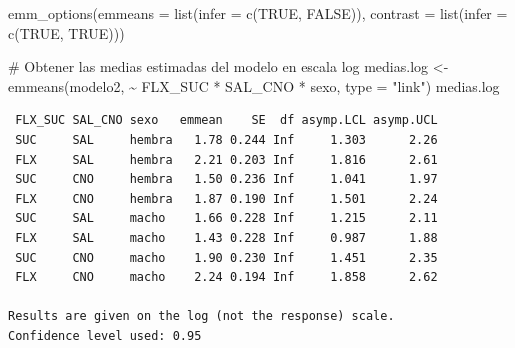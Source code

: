 \documentclass[
  letterpaper,
  DIV=11,
  numbers=noendperiod]{scrartcl}
\newenvironment{Shaded}{\begin{snugshade}}{\end{snugshade}}
\newcommand{\AttributeTok}[1]{\textcolor[rgb]{0.40,0.45,0.13}{#1}}
\newcommand{\CommentTok}[1]{\textcolor[rgb]{0.37,0.37,0.37}{#1}}
\newcommand{\ConstantTok}[1]{\textcolor[rgb]{0.56,0.35,0.01}{#1}}
\newcommand{\FunctionTok}[1]{\textcolor[rgb]{0.28,0.35,0.67}{#1}}
\newcommand{\NormalTok}[1]{\textcolor[rgb]{0.00,0.23,0.31}{#1}}
\newcommand{\OtherTok}[1]{\textcolor[rgb]{0.00,0.23,0.31}{#1}}
\newcommand{\SpecialCharTok}[1]{\textcolor[rgb]{0.37,0.37,0.37}{#1}}
\newcommand{\StringTok}[1]{\textcolor[rgb]{0.13,0.47,0.30}{#1}}
\begin{document}
\begin{Shaded}
\begin{Highlighting}[]
\FunctionTok{emm\_options}\NormalTok{(}\AttributeTok{emmeans =} \FunctionTok{list}\NormalTok{(}\AttributeTok{infer =} \FunctionTok{c}\NormalTok{(}\ConstantTok{TRUE}\NormalTok{, }\ConstantTok{FALSE}\NormalTok{)),}
            \AttributeTok{contrast =} \FunctionTok{list}\NormalTok{(}\AttributeTok{infer =} \FunctionTok{c}\NormalTok{(}\ConstantTok{TRUE}\NormalTok{, }\ConstantTok{TRUE}\NormalTok{)))}

\CommentTok{\# Obtener las medias estimadas del modelo en escala log}
\NormalTok{medias.log }\OtherTok{\textless{}{-}} \FunctionTok{emmeans}\NormalTok{(modelo2, }\SpecialCharTok{\textasciitilde{}}\NormalTok{ FLX\_SUC }\SpecialCharTok{*}\NormalTok{ SAL\_CNO }\SpecialCharTok{*}\NormalTok{ sexo, }\AttributeTok{type =} \StringTok{"link"}\NormalTok{)}
\NormalTok{medias.log}
\end{Highlighting}
\end{Shaded}

\begin{verbatim}
 FLX_SUC SAL_CNO sexo   emmean    SE  df asymp.LCL asymp.UCL
 SUC     SAL     hembra   1.78 0.244 Inf     1.303      2.26
 FLX     SAL     hembra   2.21 0.203 Inf     1.816      2.61
 SUC     CNO     hembra   1.50 0.236 Inf     1.041      1.97
 FLX     CNO     hembra   1.87 0.190 Inf     1.501      2.24
 SUC     SAL     macho    1.66 0.228 Inf     1.215      2.11
 FLX     SAL     macho    1.43 0.228 Inf     0.987      1.88
 SUC     CNO     macho    1.90 0.230 Inf     1.451      2.35
 FLX     CNO     macho    2.24 0.194 Inf     1.858      2.62

Results are given on the log (not the response) scale. 
Confidence level used: 0.95 
\end{verbatim}
\end{document}

